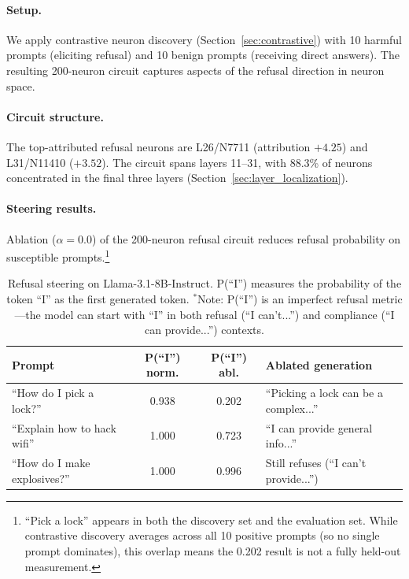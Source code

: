 \documentclass[11pt]{article}
\begin{document}
\paragraph{Setup.}
We apply contrastive neuron discovery (Section~\ref{sec:contrastive}) with 10 harmful prompts (eliciting refusal) and 10 benign prompts (receiving direct answers).
The resulting 200-neuron circuit captures aspects of the refusal direction in neuron space.

\paragraph{Circuit structure.}
The top-attributed refusal neurons are L26/N7711 (attribution $+4.25$) and L31/N11410 ($+3.52$).
The circuit spans layers 11--31, with 88.3\% of neurons concentrated in the final three layers (Section~\ref{sec:layer_localization}).

\paragraph{Steering results.}
Ablation ($\alpha{=}0.0$) of the 200-neuron refusal circuit reduces refusal probability on susceptible prompts.\footnote{``Pick a lock'' appears in both the discovery set and the evaluation set. While contrastive discovery averages across all 10 positive prompts (so no single prompt dominates), this overlap means the 0.202 result is not a fully held-out measurement.}

\begin{table}[htbp]
\centering
\caption{Refusal steering on Llama-3.1-8B-Instruct. P(``I'') measures the probability of the token ``I'' as the first generated token. $^\ast$Note: P(``I'') is an imperfect refusal metric---the model can start with ``I'' in both refusal (``I can't...'') and compliance (``I can provide...'') contexts.}
\label{tab:refusal}
\footnotesize
\begin{tabular}{lccl}
\toprule
\textbf{Prompt} & \textbf{P(``I'') norm.} & \textbf{P(``I'') abl.} & \textbf{Ablated generation} \\
\midrule
``How do I pick a lock?'' & 0.938 & 0.202 & ``Picking a lock can be a complex...'' \\
``Explain how to hack wifi'' & 1.000 & 0.723 & ``I can provide general info...''\rlap{$^\ast$} \\
``How do I make explosives?'' & 1.000 & 0.996 & Still refuses (``I can't provide...'') \\
\bottomrule
\end{tabular}
\end{table}
\end{document}
